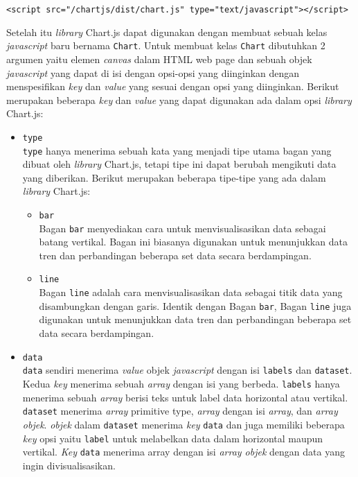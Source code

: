 \begin{center}
	\verb|<script src="/chartjs/dist/chart.js" type="text/javascript"></script>|
\end{center}

Setelah itu \textit{library} Chart.js dapat digunakan dengan membuat sebuah kelas \textit{javascript} baru bernama \verb|Chart|. Untuk membuat kelas \verb|Chart| dibutuhkan 2 argumen yaitu elemen \textit{canvas} dalam HTML web page dan sebuah objek \textit{javascript} yang dapat di isi dengan opsi-opsi yang diinginkan dengan menspesifikan \textit{key} dan \textit{value} yang sesuai dengan opsi yang diinginkan. Berikut merupakan beberapa \textit{key} dan \textit{value} yang dapat digunakan ada dalam opsi \textit{library} Chart.js:

\begin{itemize}
	\item \verb|type| \\
	\verb|type| hanya menerima sebuah kata yang menjadi tipe utama bagan yang dibuat oleh \textit{library} Chart.js, tetapi tipe ini dapat berubah mengikuti data yang diberikan. Berikut merupakan beberapa tipe-tipe yang ada dalam \textit{library} Chart.js:
	\begin{itemize}
		\item \verb|bar| \\
		Bagan \verb|bar| menyediakan cara untuk menvisualisasikan data sebagai batang vertikal. Bagan ini biasanya digunakan untuk menunjukkan data tren dan perbandingan beberapa set data secara berdampingan.
		\item \verb|line| \\
		Bagan \verb|line| adalah cara menvisualisasikan data sebagai titik data yang disambungkan dengan garis. Identik dengan Bagan \verb|bar|, Bagan \verb|line| juga digunakan untuk menunjukkan data tren dan perbandingan beberapa set data secara berdampingan.
	\end{itemize}

	\item \verb|data| \\
	\verb|data| sendiri menerima \textit{value} objek \textit{javascript} dengan isi \verb|labels| dan \verb|dataset|. Kedua \textit{key} menerima sebuah \textit{array} dengan isi yang berbeda. \verb|labels| hanya menerima sebuah \textit{array} berisi teks untuk label data horizontal atau vertikal. \verb|dataset| menerima \textit{array} primitive type, \textit{array} dengan isi \textit{array}, dan \textit{array objek}. \textit{objek} dalam \verb|dataset| menerima \textit{key} \verb|data| dan juga memiliki beberapa \textit{key} opsi yaitu \verb|label| untuk melabelkan data dalam horizontal maupun vertikal. \textit{Key} \verb|data| menerima array dengan isi \textit{array objek} dengan data yang ingin divisualisasikan.


\end{itemize}
